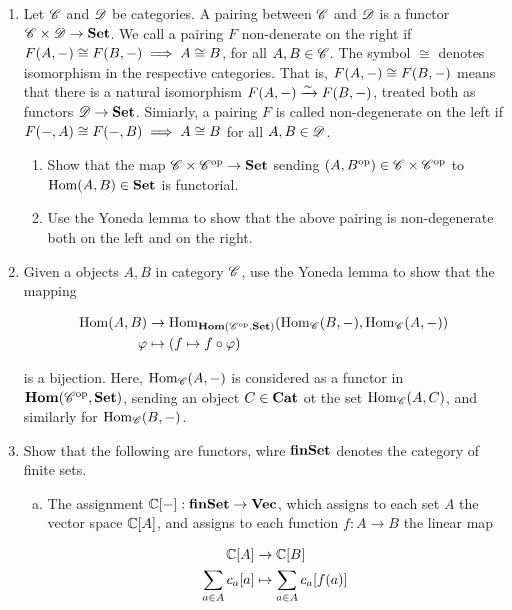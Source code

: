 \documentclass{article}
\theoremstyle{definition}
\numberwithin{figure}{section}
\begin{document}
\begin{enumerate}[\thesection .1.]
\item Let $\mathscr{C}$ and $\mathscr{D}$ be categories. A pairing between $\mathscr{C}$ and $\mathscr{D}$ is a functor $\mathscr{C}\times \mathscr{D}\to \bold{Set}$. We call a pairing $F$ non-denerate on the right if $F(A,\--)\cong F(B,\--)\implies A\cong B$, for all $A,B\in \mathscr{C}$. The symbol $\cong$ denotes isomorphism in the respective categories. That is, $F(A,\--)\cong F(B,\--)$ means that there is a natural isomorphism $F(A,\--)\xrightarrow{\sim}F(B,\--)$, treated both as functors $\mathscr{D}\to \bold{Set}$. Simiarly, a pairing $F$ is called non-degenerate on the left if $F(\--,A)\cong F(\--,B)\implies A\cong B$ for all $A,B\in \mathscr{D}$.

\begin{enumerate}
\item Show that the map $\mathscr{C}\times \mathscr{C}^{\mathrm{op}}\to \bold{Set}$ sending $(A,B^{\mathrm{op}})\in \mathscr{C}\times \mathscr{C}^{\mathrm{op}}$ to $\mathrm{Hom}(A,B)\in \bold{Set}$ is functorial.
\item Use the Yoneda lemma to show that the above pairing is non-degenerate both on the left and on the right.
\end{enumerate}

\item Given a objects $A,B$ in category $\mathscr{C}$, use the Yoneda lemma to show that the mapping

\begin{align*}
\mathrm{Hom}(A,B)&\to \mathrm{Hom}_{\bold{Hom}(\mathscr{C}^{\mathrm{op}},\bold{Set})}(\mathrm{Hom}_{\mathscr{C}}(B,\--),\mathrm{Hom}_{\mathscr{C}}(A,\--))\\
\varphi & \mapsto \left(f\mapsto f\circ \varphi\right)
\end{align*}

is a bijection. Here, $\mathrm{Hom}_{\mathscr{C}}(A,\--)$ is considered as a functor in $\bold{Hom}(\mathscr{C}^{\mathrm{op}},\bold{Set})$, sending an object $C\in \bold{Cat}$ ot the set $\mathrm{Hom}_{\mathscr{C}}(A,C)$, and similarly for $\mathrm{Hom}_{\mathscr{C}}(B,\--)$.

\item Show that the following are functors, whre $\bold{finSet}$ denotes the category of finite sets.

\begin{enumerate}[(a)]
\item The assignment $\mathbb{C}[\--]:\bold{finSet}\to\bold{Vec}$, which assigns to each set $A$ the vector space $\mathbb{C}[A]$, and assigns to each function $f:A\to B$ the linear map

\begin{align*}
\mathbb{C}[A]&\xrightarrow{} \mathbb{C}[B]\\
\sum_{a\in A}c_a [a]&\mapsto \sum_{a\in A}c_a[f(a)]
\end{align*}


\end{enumerate}
\end{enumerate}
\end{document}
